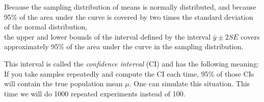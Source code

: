 \documentclass[12pt,]{krantz}
\newenvironment{Shaded}{\begin{snugshade}}{\end{snugshade}}
\newcommand{\CommentTok}[1]{\textcolor[rgb]{0.56,0.35,0.01}{\textit{#1}}}
\newcommand{\ControlFlowTok}[1]{\textcolor[rgb]{0.13,0.29,0.53}{\textbf{#1}}}
\newcommand{\DataTypeTok}[1]{\textcolor[rgb]{0.13,0.29,0.53}{#1}}
\newcommand{\DecValTok}[1]{\textcolor[rgb]{0.00,0.00,0.81}{#1}}
\newcommand{\KeywordTok}[1]{\textcolor[rgb]{0.13,0.29,0.53}{\textbf{#1}}}
\newcommand{\NormalTok}[1]{#1}
\newcommand{\OperatorTok}[1]{\textcolor[rgb]{0.81,0.36,0.00}{\textbf{#1}}}
\newcommand{\OtherTok}[1]{\textcolor[rgb]{0.56,0.35,0.01}{#1}}
\newcommand{\StringTok}[1]{\textcolor[rgb]{0.31,0.60,0.02}{#1}}
\begin{document}
Because the sampling distribution of means is normally distributed, and because 95\% of the area under the curve is covered by two times the standard deviation of the normal distribution,\\
the upper and lower bounds of the interval defined by the interval \(\bar{y} \pm 2 SE\) covers approximately 95\% of the area under the curve in the sampling distribution.

This interval is called the \emph{confidence interval} (CI) and has the following meaning: If you take samples repeatedly and compute the CI each time, 95\% of those CIs will contain the true population mean \(\mu\). One can simulate this situation. This time we will do 1000 repeated experiments instead of 100.

\begin{Shaded}
\end{Shaded}
\end{document}
